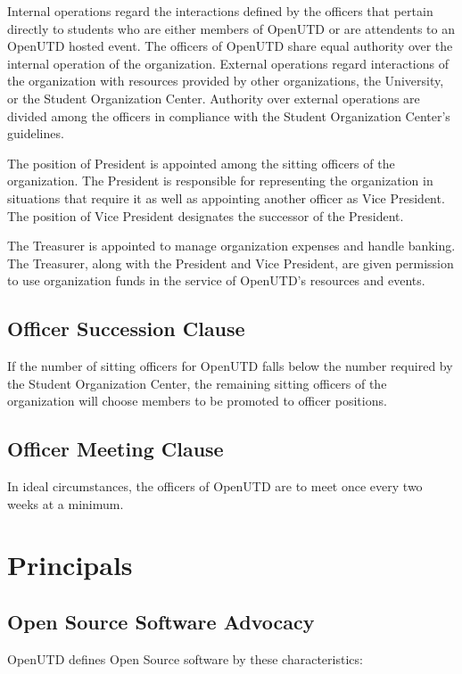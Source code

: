 \documentclass{constitution}
\begin{document}
Internal operations regard the interactions defined by the officers that pertain
directly to students who are either members of OpenUTD or are attendents to an
OpenUTD hosted event. The officers of OpenUTD share equal authority over the
internal operation of the organization. External operations regard interactions
of the organization with resources provided by other organizations, the
University, or the Student Organization Center. Authority over external
operations are divided among the officers in compliance with the Student
Organization Center's guidelines.

The position of President is appointed among the sitting officers of the
organization. The President is responsible for representing the organization in
situations that require it as well as appointing another officer as Vice
President. The position of Vice President designates the successor of the
President.

The Treasurer is appointed to manage organization expenses and handle banking.
The Treasurer, along with the President and Vice President, are given permission
to use organization funds in the service of OpenUTD's resources and events.

\subsection{Officer Succession Clause}

If the number of sitting officers for OpenUTD falls below the number required by
the Student Organization Center, the remaining sitting officers of the
organization will choose members to be promoted to officer positions.

\subsection{Officer Meeting Clause}

In ideal circumstances, the officers of OpenUTD are to meet once every two weeks
at a minimum.

\section{Principals}

\subsection{Open Source Software Advocacy}

OpenUTD defines Open Source software by these characteristics:
\end{document}
